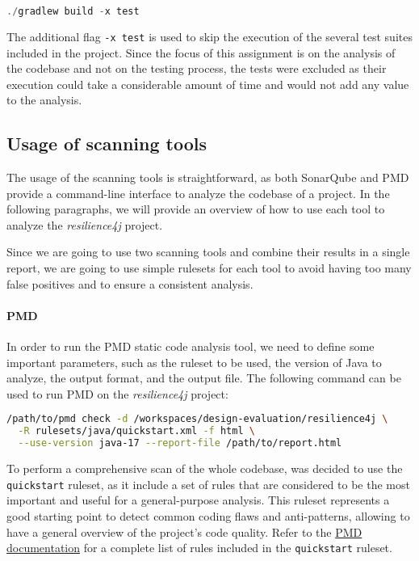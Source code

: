 \begin{lstlisting}[language=C++, caption=Building the project]
                    ./gradlew build -x test
\end{lstlisting}

The additional flag \texttt{-x test} is used to skip the execution of the several test suites included in the project. Since the focus of this assignment is on the analysis of the codebase and not on the testing process, the tests were excluded as their execution could take a considerable amount of time and would not add any value to the analysis.

\subsection{Usage of scanning tools}

The usage of the scanning tools is straightforward, as both SonarQube and PMD provide a command-line interface to analyze the codebase of a project. In the following paragraphs, we will provide an overview of how to use each tool to analyze the \textit{resilience4j} project. 

Since we are going to use two scanning tools and combine their results in a single report, we are going to use simple rulesets for each tool to avoid having too many false positives and to ensure a consistent analysis.

\paragraph{PMD}

In order to run the PMD static code analysis tool, we need to define some important parameters, such as the ruleset to be used, the version of Java to analyze, the output format, and the output file. The following command can be used to run PMD on the \textit{resilience4j} project:

\begin{lstlisting}[language=bash, caption={Command to run PDM static code analysis}]
/path/to/pmd check -d /workspaces/design-evaluation/resilience4j \
  -R rulesets/java/quickstart.xml -f html \
  --use-version java-17 --report-file /path/to/report.html
\end{lstlisting}

\noindent To perform a comprehensive scan of the whole codebase, was decided to use the \texttt{quickstart} ruleset, as it include a set of rules that are considered to be the most important and useful for a general-purpose analysis. This ruleset represents a good starting point to detect common coding flaws and anti-patterns, allowing to have a general overview of the project's code quality. Refer to the \href{https://pmd.github.io/pmd/pmd_rules_java.html#additional-rulesets}{PMD documentation} for a complete list of rules included in the \texttt{quickstart} ruleset.

